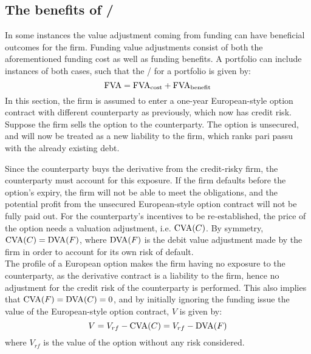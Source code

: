 \documentclass[../main.tex]{subfiles}
\begin{document}
    \subsection{The benefits of \FVA/}
        In some instances the value adjustment coming from funding can have beneficial outcomes for the firm. 
        Funding value adjustments consist of both the aforementioned funding cost as well as funding benefits. 
        A portfolio can include instances of both cases, such that the \FVA/ for a portfolio is given by:
        \begin{equation}
            \text{\FVA/} = \text{\FVA/}_{\text{cost}} + \text{\FVA/}_{\text{benefit}}
        \end{equation}
        In this section, the firm is assumed to enter a one-year European-style option contract 
        with different counterparty as previously,
        which now has credit risk.
        Suppose the firm sells the option to the counterparty. 
        The option is unsecured, and will now be treated as a new liability to the firm, 
        which ranks pari passu with the already existing debt.

        Since the counterparty buys the derivative from the credit-risky firm, 
        the counterparty must account for this exposure. 
        If the firm defaults before the option's expiry, the firm will not be able to meet the obligations, 
        and the potential profit from the unsecured European-style option contract will not be fully paid out. 
        For the counterparty's incentives to be re-established, 
        the price of the option needs a valuation adjustment, i.e. $\text{\CVA/}(C)$. 
        By symmetry, $\text{\CVA/}(C) = \text{\DVA/}(F)$, 
        where $\text{\DVA/}(F)$ is the debit value adjustment made by the firm 
        in order to account for its own risk of default.\\
        The profile of a European option makes the firm having no exposure to the counterparty, 
        as the derivative contract is a liability to the firm, 
        hence no adjustment for the credit risk of the counterparty is performed. 
        This also implies that $\text{\CVA/}(F) = \text{\DVA/}(C) = 0$, 
        and by initially ignoring the funding issue the value of the European-style option contract, $V$ is given by:
        \begin{equation}\label{eqn:option-value-credit-risk}
            V = V_{rf} - \text{\CVA/}(C) = V_{rf} - \text{\DVA/}(F)
        \end{equation}
        where $V_{rf}$ is the value of the option without any risk considered.
\end{document}

